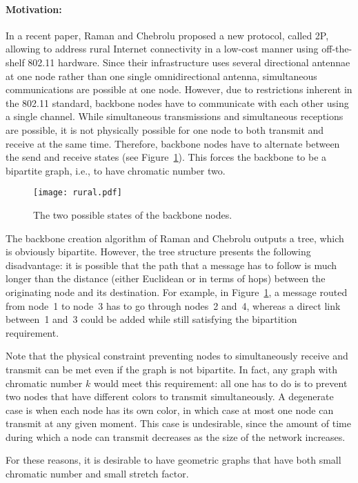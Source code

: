 \documentclass[pdftex,leqno,fleqn,12pts]{llncs}
\begin{document}
\paragraph{Motivation:} 
In a recent paper, Raman and Chebrolu \cite{raman05} proposed a new
protocol, called 2P, allowing to address rural Internet connectivity
in a low-cost manner using off-the-shelf 802.11 hardware. Since
their infrastructure uses several directional antennae at one node
rather than one single omnidirectional antenna, simultaneous
communications are possible at one node. However, due to
restrictions inherent in the 802.11 standard, backbone nodes have to
communicate with each other using a single channel. While
simultaneous transmissions and simultaneous receptions are 
possible, it is not physically possible for one node to both
transmit and receive at the same time. Therefore, backbone nodes
have to alternate between the send and receive states (see
Figure~\ref{fig-rural}). This forces the backbone to be a bipartite
graph, i.e., to have chromatic number two.

\begin{figure}
 \centering\texttt{[image: rural.pdf]} 
 \caption{The two possible states of the backbone nodes.}
 \label{fig-rural}
\end{figure}

The backbone creation algorithm of Raman and Chebrolu \cite{raman05}
outputs a tree, which is obviously bipartite. However, the
tree structure presents the following disadvantage: it is possible
that the path that a message has to follow is much longer than the
distance (either Euclidean or in terms of hops) between the
originating node and its destination. For example, in
Figure~\ref{fig-rural}, a message routed from node~1 to node~3 has
to go through nodes~2 and~4, whereas a direct link between~1 and~3
could be added while still satisfying the bipartition requirement.

Note that the physical constraint preventing nodes to simultaneously
receive and transmit can be met even if the graph is not bipartite.
In fact, any graph with chromatic number $k$ would meet this
requirement: all one has to do is to prevent two nodes that have
different colors to transmit simultaneously. A degenerate case is
when each node has its own color, in which case at most one node can
transmit at any given moment. This case is undesirable, since the
amount of time during which a node can transmit decreases as the
size of the network increases.

For these reasons, it is desirable to have geometric graphs that
have both small chromatic number and small stretch factor. 
\end{document}
